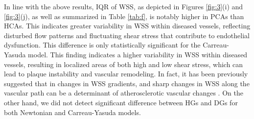 ﻿\documentclass[12pt,a4paper]{article}
\theoremstyle{definition}
\numberwithin{equation}{section}
\begin{document}
In line with the above results, IQR of WSS, as depicted in Figures \ref{fig:3}(i) and \ref{fig:3}(j), as well as summarized in Table \ref{tab:f}, is notably higher in PCAs than HCAs. This indicates greater variability in WSS within diseased vessels, reflecting disturbed flow patterns and fluctuating shear stress that contribute to endothelial dysfunction. This difference is only statistically significant for the Carreau-Yasuda model. This finding indicates a higher variability in WSS within diseased vessels, resulting in localized areas of both high and low shear stress, which can lead to plaque instability and vascular remodeling. In fact, it has been previously suggested that in changes in WSS gradients, and sharp changes in WSS along the vascular path can be a determinant of atherosclerotic vascular changes \cite{72, 73}. On the other hand, we did not detect significant difference between HGs and DGs for both Newtonian and Carreau-Yasuda models. 
\end{document}
